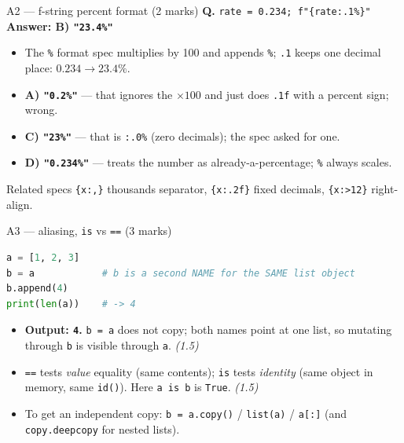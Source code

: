 \documentclass[aspectratio=169,11pt]{beamer}
\begin{document}
\begin{frame}[fragile]{A2 --- f-string percent format (2 marks)}
\textbf{Q.} \texttt{rate = 0.234; f"\{rate:.1\%\}"} \hfill \textbf{Answer: B) \texttt{"23.4\%"}}
\begin{itemize}
  \item The \texttt{\%} format spec \textcolor{cgreen}{multiplies by 100 and appends \texttt{\%}};
        \texttt{.1} keeps one decimal place: $0.234 \to 23.4\%$.
  \item \textbf{A) \texttt{"0.2\%"}} --- that ignores the $\times 100$ and just does \texttt{.1f} with a
        percent sign; wrong.
  \item \textbf{C) \texttt{"23\%"}} --- that is \texttt{:.0\%} (zero decimals); the spec asked for one.
  \item \textbf{D) \texttt{"0.234\%"}} --- treats the number as already-a-percentage; \texttt{\%} always scales.
\end{itemize}
\begin{block}{Related specs}
\footnotesize \texttt{\{x:,\}} thousands separator, \texttt{\{x:.2f\}} fixed decimals, \texttt{\{x:>12\}} right-align.
\end{block}
\end{frame}

\begin{frame}[fragile]{A3 --- aliasing, \texttt{is} vs \texttt{==} (3 marks)}
\begin{lstlisting}[language=Python]
a = [1, 2, 3]
b = a            # b is a second NAME for the SAME list object
b.append(4)
print(len(a))    # -> 4
\end{lstlisting}
\begin{itemize}
  \item \textbf{Output: \texttt{4}.} \texttt{b = a} does not copy; both names point at one list, so
        mutating through \texttt{b} is visible through \texttt{a}. \hfill \emph{(1.5)}
  \item \textcolor{hsbiblue}{\texttt{==}} tests \emph{value} equality (same contents);
        \textcolor{hsbiblue}{\texttt{is}} tests \emph{identity} (same object in memory,
        same \texttt{id()}). Here \texttt{a is b} is \texttt{True}. \hfill \emph{(1.5)}
  \item To get an independent copy: \texttt{b = a.copy()} / \texttt{list(a)} / \texttt{a[:]}
        (and \texttt{copy.deepcopy} for nested lists).
\end{itemize}
\end{frame}
\end{document}
